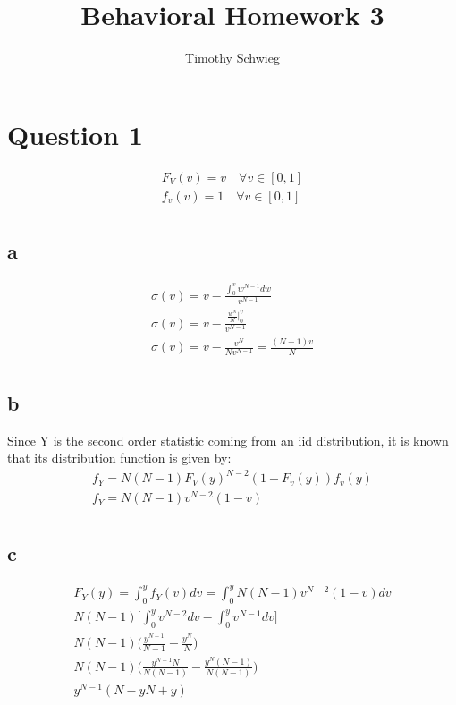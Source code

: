 \documentclass[10pt]{paper}
\title{Behavioral Homework 3}
\author{Timothy Schwieg}
\begin{document}
\maketitle

\section*{Question 1}
\begin{align*}
  F_V(v) = v \quad \forall v \in [0,1]\\
  f_v(v) = 1 \quad \forall v \in [0,1]\\
\end{align*}

\subsection*{a}
\begin{align*}
  \sigma(v) = v - \frac{\int_0^v w^{N-1} dw}{v^{N-1}}\\
  \sigma(v) = v - \frac{\frac{w^N}{N} \big |_0^v}{v^{N-1}}\\
  \sigma(v) = v - \frac{v^N}{N v^{N-1}} = \frac{(N-1)v}{N}\\
\end{align*}

\subsection*{b}
Since Y is the second order statistic coming from an iid distribution, it is
known that its distribution function is given by:
\begin{align*}
  f_Y = N(N-1)F_V(y)^{N-2}(1-F_v(y))f_v(y)\\
  f_Y = N(N-1)v^{N-2}(1-v)\\
\end{align*}

\subsection*{c}
\begin{align*}
  F_Y(y) = \int_0^yf_Y(v)dv = \int_0^y N(N-1)v^{N-2}(1-v)dv \\
  N(N-1) \big [ \int_0^y v^{N-2}dv - \int_0^y v^{N-1} dv \big ]\\
  N(N-1) \big ( \frac{y^{N-1}}{N-1} - \frac{y^N}{N} \big )\\
  N(N-1) \big ( \frac{y^{N-1}N}{N(N-1)} - \frac{y^N(N-1)}{N(N-1)} \big )\\
  y^{N-1}( N - yN + y)\\
\end{align*}
\end{document}

